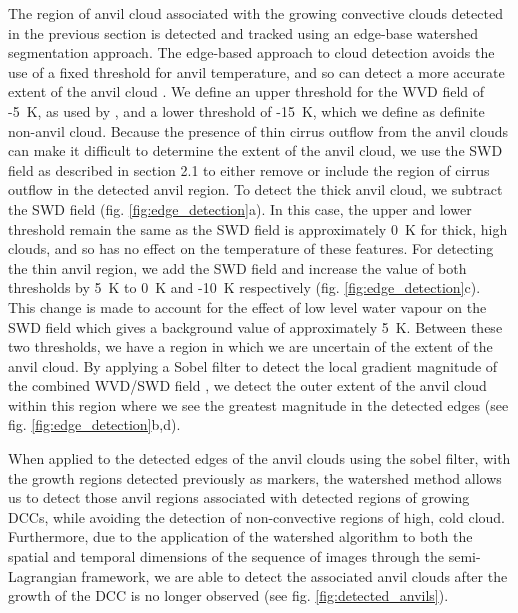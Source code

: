 \documentclass[amt, manuscript]{copernicus}
\begin{document}
The region of anvil cloud associated with the growing convective clouds detected in the previous section is detected and tracked using an edge-base watershed segmentation approach.
The edge-based approach to cloud detection avoids the use of a fixed threshold for anvil temperature, and so can detect a more accurate extent of the anvil cloud \citep{dim_alternative_2013}.
We define an upper threshold for the WVD field of -5~\unit{K}, as used by \citet{muller_role_2018}, and a lower threshold of -15~\unit{K}, which we define as definite non-anvil cloud.
Because the presence of thin cirrus outflow from the anvil clouds can make it difficult to determine the extent of the anvil cloud, we use the SWD field as described in section 2.1 to either remove or include the region of cirrus outflow in the detected anvil region.
To detect the thick anvil cloud, we subtract the SWD field (fig. \ref{fig:edge_detection}a).
In this case, the upper and lower threshold remain the same as the SWD field is approximately 0~K for thick, high clouds, and so has no effect on the temperature of these features.
For detecting the thin anvil region, we add the SWD field and increase the value of both thresholds by 5~K to 0~K and -10~K respectively (fig. \ref{fig:edge_detection}c).
This change is made to account for the effect of low level water vapour on the SWD field which gives a background value of approximately 5~K.
Between these two thresholds, we have a region in which we are uncertain of the extent of the anvil cloud.
By applying a Sobel filter to detect the local gradient magnitude of the combined WVD/SWD field \citep{sobel_isotropic_2014}, we detect the outer extent of the anvil cloud within this region where we see the greatest magnitude in the detected edges (see fig. \ref{fig:edge_detection}b,d).

When applied to the detected edges of the anvil clouds using the sobel filter, with the growth regions detected previously as markers, the watershed method allows us to detect those anvil regions associated with detected regions of growing DCCs, while avoiding the detection of non-convective regions of high, cold cloud.
Furthermore, due to the application of the watershed algorithm to both the spatial and temporal dimensions of the sequence of images through the semi-Lagrangian framework, we are able to detect the associated anvil clouds after the growth of the DCC is no longer observed (see fig. \ref{fig:detected_anvils}).
\end{document}
